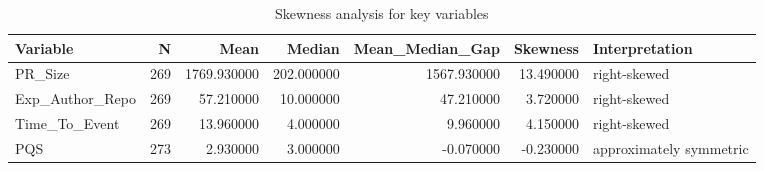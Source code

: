 \begin{table}
\caption{Skewness analysis for key variables}
\label{tab:appendix-b-skewness}
\begin{tabular}{lrrrrrl}
\toprule
Variable & N & Mean & Median & Mean\_Median\_Gap & Skewness & Interpretation \\
\midrule
PR\_Size & 269 & 1769.930000 & 202.000000 & 1567.930000 & 13.490000 & right-skewed \\
Exp\_Author\_Repo & 269 & 57.210000 & 10.000000 & 47.210000 & 3.720000 & right-skewed \\
Time\_To\_Event & 269 & 13.960000 & 4.000000 & 9.960000 & 4.150000 & right-skewed \\
PQS & 273 & 2.930000 & 3.000000 & -0.070000 & -0.230000 & approximately symmetric \\
\bottomrule
\end{tabular}
\end{table}
